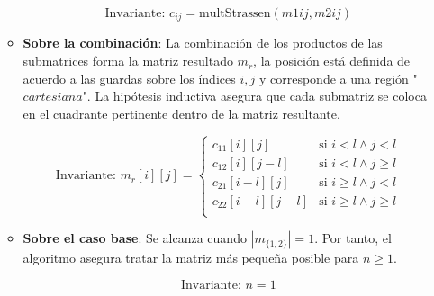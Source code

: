 \documentclass[12pt, a4paper]{article}
\begin{document}
\begin{itemize}
\begin{itemize}
        \[
        \text{{Invariante: }} c_{ij} = \text{{multStrassen}}(m{{1{ij}}}, m{{2{ij}}})
        \]

        \item \textbf{Sobre la combinación}: La combinación de los productos de las submatrices forma la matriz resultado $m_r$, la posición está definida de acuerdo a las guardas sobre los índices $i,j$ y corresponde a una región "$cartesiana$". La hipótesis inductiva asegura que cada submatriz se coloca en el cuadrante pertinente dentro de la matriz resultante.

        \[
        \text{{Invariante: }} m_r[i][j] = \begin{cases}
        c_{11}[i][j] & \text{{si }} i < l \land j < l \\
        c_{12}[i][j-l] & \text{{si }} i < l \land j \geq l \\
        c_{21}[i-l][j] & \text{{si }} i \geq l \land j < l \\
        c_{22}[i-l][j-l] & \text{{si }} i \geq l \land j \geq l \\
        \end{cases}
        \]

        \item \textbf{Sobre el caso base}: Se alcanza cuando $|m_{\{1,2\}}| = 1$. Por tanto, el algoritmo asegura tratar la matriz más pequeña posible para $n \geq 1$.

        \[
        \text{{Invariante: }} n = 1
        \]
    \end{itemize}
\end{itemize}
\end{document}
